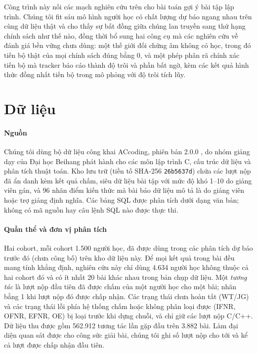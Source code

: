 \documentclass[a4paper,preprint,12pt,authoryear]{elsarticle}
\begin{document}
Công trình này nối các mạch nghiên cứu trên cho bài toán gợi ý bài tập lập trình. Chúng tôi fit sáu mô hình người học có chất lượng dự báo ngang nhau trên cùng dữ liệu thật và cho thấy sự bất đồng giữa chúng lan truyền sang thứ hạng chính sách như thế nào, đồng thời bổ sung hai công cụ mà các nghiên cứu về đánh giá bền vững chưa dùng: một thế giới đối chứng âm không có học, trong đó tiến bộ thật của mọi chính sách đúng bằng 0, và một phép phân rã chính xác tiến bộ mà tracker báo cáo thành độ trôi và phần bất ngờ, kèm các kết quả hình thức đồng nhất tiến bộ trong mô phỏng với độ trôi tích lũy.

\section{Dữ liệu}\label{sec:data}

\paragraph{Nguồn} Chúng tôi dùng bộ dữ liệu công khai ACcoding, phiên bản 2.0.0 \citep{chen2024accoding,sun2026accodingdata}, do nhóm giảng dạy của Đại học Beihang phát hành cho các môn lập trình C, cấu trúc dữ liệu và phân tích thuật toán. Kho lưu trữ (tiền tố SHA-256 \texttt{26b5637d}) chứa các lượt nộp đã ẩn danh kèm kết quả chấm, siêu dữ liệu bài tập với mức độ khó 1--10 do giảng viên gán, và 96 nhãn điểm kiến thức mà bài báo dữ liệu mô tả là do giảng viên hoặc trợ giảng định nghĩa. Các bảng SQL được phân tích dưới dạng văn bản; không có mã nguồn hay câu lệnh SQL nào được thực thi.

\paragraph{Quần thể và đơn vị phân tích} Hai cohort, mỗi cohort 1.500 người học, đã được dùng trong các phân tích dự báo trước đó (chưa công bố) trên kho dữ liệu này. Để mọi kết quả trong bài đều mang tính khẳng định, nghiên cứu này chỉ dùng 4.634 người học không thuộc cả hai cohort đó và có ít nhất 20 bài khác nhau trong bản chụp dữ liệu. Một \emph{tương tác} là lượt nộp đầu tiên đã được chấm của một người học cho một bài; nhãn bằng 1 khi lượt nộp đó được chấp nhận. Các trạng thái chưa hoàn tất (WT/JG) và các trạng thái lỗi phía hệ thống chấm hoặc không phân loại được (IFNR, OFNR, EFNR, OE) bị loại trước khi dựng chuỗi, và chỉ giữ các lượt nộp C/C++. Dữ liệu thu được gồm 562.912 tương tác lần gặp đầu trên 3.882 bài. Làm đại diện quan sát được cho công sức giải bài, chúng tôi ghi số lượt nộp cho tới và kể cả lượt được chấp nhận đầu tiên.
\end{document}
